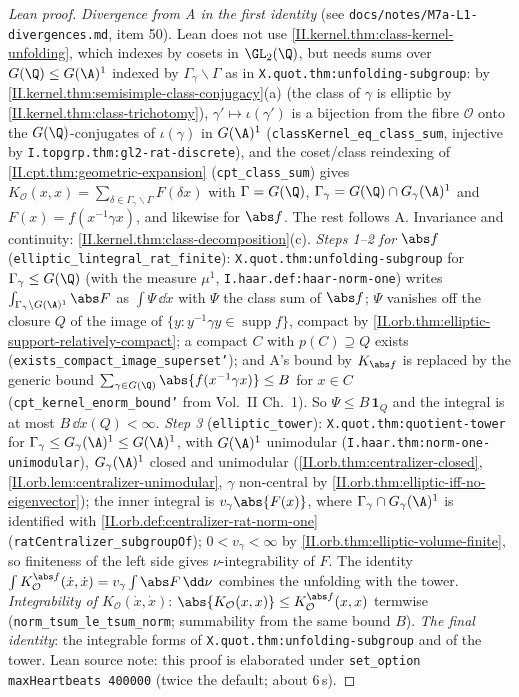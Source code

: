 \begin{proof}[Lean proof]
\emph{Divergence from A in the first identity} (see \texttt{docs/notes/M7a-L1-divergences.md}, item 50). Lean does not use \cref{II.kernel.thm:class-kernel-unfolding}, which indexes by cosets in $\GL_2(\Q)$, but needs sums over $G(\Q)\le G(\A)^1$ indexed by $\Gamma_\gamma\backslash\Gamma$ as in \texttt{X.quot.thm:unfolding-subgroup}: by \cref{II.kernel.thm:semisimple-class-conjugacy}(a) (the class of $\gamma$ is elliptic by \cref{II.kernel.thm:class-trichotomy}), $\gamma'\mapsto\iota(\gamma')$ is a bijection from the fibre $\mathcal O$ onto the $G(\Q)$-conjugates of $\iota(\gamma)$ in $G(\A)^1$ (\texttt{classKernel\_eq\_class\_sum}, injective by \texttt{I.topgrp.thm:gl2-rat-discrete}), and the coset/class reindexing of \cref{II.cpt.thm:geometric-expansion} (\texttt{cpt\_class\_sum}) gives $K_{\mathcal O}(x,x)=\sum_{\delta\in\Gamma_\gamma\backslash\Gamma}F(\delta x)$ with $\Gamma=G(\Q)$, $\Gamma_\gamma=G(\Q)\cap G_\gamma(\A)^1$ and $F(x)=f(x^{-1}\gamma x)$, and likewise for $\abs f$. The rest follows A. Invariance and continuity: \cref{II.kernel.thm:class-decomposition}(c). \emph{Steps 1--2 for $\abs f$} (\texttt{elliptic\_lintegral\_rat\_finite}): \texttt{X.quot.thm:unfolding-subgroup} for $\Gamma_\gamma\le G(\Q)$ (with the measure $\mu^1$, \texttt{I.haar.def:haar-norm-one}) writes $\int_{\Gamma_\gamma\backslash G(\A)^1}\abs F$ as $\int\Psi\,\dd\dot x$ with $\Psi$ the class sum of $\abs f$; $\Psi$ vanishes off the closure $Q$ of the image of $\{y:y^{-1}\gamma y\in\operatorname{supp}f\}$, compact by \cref{II.orb.thm:elliptic-support-relatively-compact}; a compact $C$ with $p(C)\supseteq Q$ exists (\texttt{exists\_compact\_image\_superset'}); and A's bound by $K_{\abs f}$ is replaced by the generic bound $\sum_{\gamma\in G(\Q)}\abs{f(x^{-1}\gamma x)}\le B$ for $x\in C$ (\texttt{cpt\_kernel\_enorm\_bound'} from Vol.~II Ch.~1). So $\Psi\le B\,\mathbf 1_Q$ and the integral is at most $B\,\dd\dot x(Q)<\infty$. \emph{Step 3} (\texttt{elliptic\_tower}): \texttt{X.quot.thm:quotient-tower} for $\Gamma_\gamma\le G_\gamma(\A)^1\le G(\A)^1$, with $G(\A)^1$ unimodular (\texttt{I.haar.thm:norm-one-unimodular}), $G_\gamma(\A)^1$ closed and unimodular (\cref{II.orb.thm:centralizer-closed}, \cref{II.orb.lem:centralizer-unimodular}, $\gamma$ non-central by \cref{II.orb.thm:elliptic-iff-no-eigenvector}); the inner integral is $v_\gamma\abs{F(x)}$, where $\Gamma_\gamma\cap G_\gamma(\A)^1$ is identified with \cref{II.orb.def:centralizer-rat-norm-one} (\texttt{ratCentralizer\_subgroupOf}); $0<v_\gamma<\infty$ by \cref{II.orb.thm:elliptic-volume-finite}, so finiteness of the left side gives $\nu$-integrability of $F$. The identity $\int K^{\abs f}_{\mathcal O}(\dot x,\dot x)=v_\gamma\int\abs F\,\dd\nu$ combines the unfolding with the tower. \emph{Integrability of $K_{\mathcal O}(\dot x,\dot x)$}: $\abs{K_{\mathcal O}(x,x)}\le K^{\abs f}_{\mathcal O}(x,x)$ termwise (\texttt{norm\_tsum\_le\_tsum\_norm}; summability from the same bound $B$). \emph{The final identity}: the integrable forms of \texttt{X.quot.thm:unfolding-subgroup} and of the tower. Lean source note: this proof is elaborated under \texttt{set\_option maxHeartbeats 400000} (twice the default; about 6\,s).
\end{proof}

